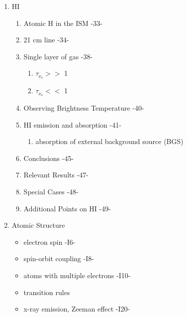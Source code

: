 \documentclass{article}
\begin{document}
\begin{enumerate}[label=\Roman*.]
\item HI
\begin{enumerate}
  \item Atomic H in the ISM -33-
  \item 21 cm line -34-
  \item Single layer of gas -38-
  \begin{enumerate}
    \item $\tau_{\nu_o}  >>$ 1
    \item $\tau_{\nu_o} <<$ 1
  \end{enumerate}
  \item Observing Brightness Temperature -40-
  \item HI emission and absorption -41-
  \begin{enumerate}
    \item absorption of external background source (BGS)
  \end{enumerate}
  \item Conclusions -45-
  \item Relevant Results -47-
  \item Special Cases -48-
  \item Additional Points on HI -49-
\end{enumerate}

\item Atomic Structure
\begin{itemize}
  \item electron spin -I6-
  \item spin-orbit coupling -I8-
  \item atoms with multiple electrons -I10-
  \item transition rules
  \item x-ray emission, Zeeman effect -I20-
\end{itemize}


\end{enumerate}
\end{document}
